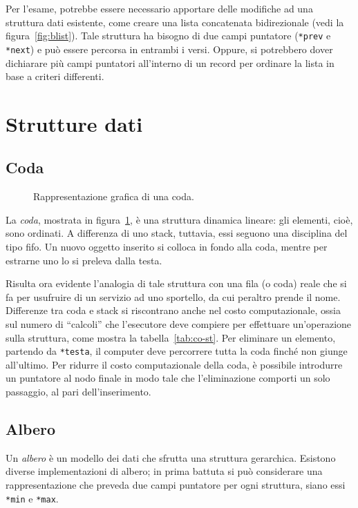 Per l'esame, potrebbe essere necessario apportare delle modifiche ad una struttura dati esistente, come creare una lista concatenata bidirezionale (vedi la figura~\ref{fig:blist}).
Tale struttura ha bisogno di due campi puntatore (\lstinline!*prev! e \lstinline!*next!) e può essere percorsa in entrambi i versi.
Oppure, si potrebbero dover dichiarare più campi puntatori all'interno di un record per ordinare la lista in base a criteri differenti.

	\section{Strutture dati}

		\subsection{Coda}
		\label{subsec:coda}

\begin{figure}
	\centering

	\caption[Coda]{Rappresentazione grafica di una coda.}
	\label{fig:coda}
\end{figure}
La \emph{coda}, mostrata in figura~\ref{fig:coda}, è una struttura dinamica lineare: gli elementi, cioè, sono ordinati.
A differenza di uno stack, tuttavia, essi seguono una disciplina del tipo \ac{fifo}.
Un nuovo oggetto inserito si colloca in fondo alla coda, mentre per estrarne uno lo si preleva dalla testa.

Risulta ora evidente l'analogia di tale struttura con una fila (o coda) reale che si fa per usufruire di un servizio ad uno sportello, da cui peraltro prende il nome.
Differenze tra coda e stack si riscontrano anche nel costo computazionale, ossia sul numero di ``calcoli'' che l'esecutore deve compiere per effettuare un'operazione sulla struttura, come mostra la tabella~\ref{tab:co-st}.
Per eliminare un elemento, partendo da \lstinline!*testa!, il computer deve percorrere tutta la coda finché non giunge all'ultimo.
Per ridurre il costo computazionale della coda, è possibile introdurre un puntatore al nodo finale in modo tale che l'eliminazione comporti un solo passaggio, al pari dell'inserimento.

		\subsection{Albero}
		\label{subsec:albero}
Un \emph{albero} è un modello dei dati che sfrutta una struttura gerarchica.
Esistono diverse implementazioni di albero; in prima battuta si può considerare una rappresentazione che preveda due campi puntatore per ogni struttura, siano essi \lstinline!*min! e \lstinline!*max!.

